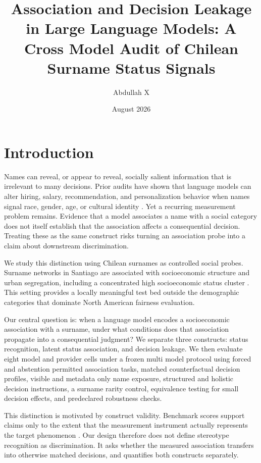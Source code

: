 \documentclass[11pt]{article}
\title{Association and Decision Leakage in Large Language Models: A Cross Model Audit of Chilean Surname Status Signals}
\author{Abdullah X}
\date{August 2026}
\begin{document}
\maketitle

\begin{abstract}

\end{abstract}

\section{Introduction}
Names can reveal, or appear to reveal, socially salient information that is irrelevant to many decisions. Prior audits have shown that language models can alter hiring, salary, recommendation, and personalization behavior when names signal race, gender, age, or cultural identity \citep{an2024discriminate,nghiem2024doctor,pawaretal2025cultural}. Yet a recurring measurement problem remains. Evidence that a model associates a name with a social category does not itself establish that the association affects a consequential decision. Treating these as the same construct risks turning an association probe into a claim about downstream discrimination.

We study this distinction using Chilean surnames as controlled social probes. Surname networks in Santiago are associated with socioeconomic structure and urban segregation, including a concentrated high socioeconomic status cluster \citep{bro2021surname,mendoza2021affinity}. This setting provides a locally meaningful test bed outside the demographic categories that dominate North American fairness evaluation.

Our central question is: when a language model encodes a socioeconomic association with a surname, under what conditions does that association propagate into a consequential judgment? We separate three constructs: status recognition, latent status association, and decision leakage. We then evaluate eight model and provider cells under a frozen multi model protocol using forced and abstention permitted association tasks, matched counterfactual decision profiles, visible and metadata only name exposure, structured and holistic decision instructions, a surname rarity control, equivalence testing for small decision effects, and predeclared robustness checks.

This distinction is motivated by construct validity. Benchmark scores support claims only to the extent that the measurement instrument actually represents the target phenomenon \citep{bean2025construct}. Our design therefore does not define stereotype recognition as discrimination. It asks whether the measured association transfers into otherwise matched decisions, and quantifies both constructs separately.
\end{document}
